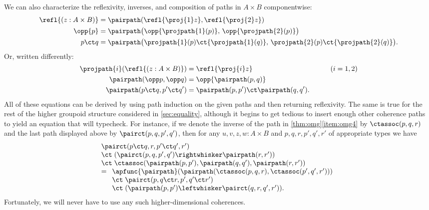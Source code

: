 We can also characterize the reflexivity, inverses, and composition of paths in $A\times B$ componentwise:
\begin{align*}
  {\refl{(z : A \times B)}}
  &= {\pairpath (\refl{\proj{1} z},\refl{\proj{2} z})} \\
  {\opp{p}}
  &= {\pairpath \big(\opp{\projpath{1} (p)},\, \opp{\projpath{2} (p)}\big)} \\
  {{p \ct q}}
  &= {\pairpath \big({\projpath{1} (p)} \ct {\projpath{1} (q)},\,{\projpath{2} (p)} \ct {\projpath{2} (q)}\big)}.
\end{align*}
Or, written differently:
\begin{alignat*}{2}
  \projpath{i}(\refl{(z : A \times B)}) &= \refl{\proj{i} z} &\qquad (i=1,2)\\
  \pairpath(\opp p, \opp q) &= \opp{\pairpath(p,q)}\\
  \pairpath(p\ct q, p'\ct q') &= \pairpath(p,p') \ct \pairpath(q,q').
\end{alignat*}
All of these equations can be derived by using path induction on the given paths and then returning reflexivity.
The same is true for the rest of the higher groupoid structure considered in \cref{sec:equality}, although it begins to get tedious to insert enough other coherence paths to yield an equation that will typecheck.
For instance, if we denote the inverse of the path in \cref{thm:omg}\ref{item:omg4} by $\ctassoc(p,q,r)$ and the last path displayed above by $\pairct(p,q,p',q')$, then for any $u,v,z,w:A\times B$ and $p,q,r,p',q',r'$ of appropriate types we have
\begin{equation*}
  \begin{array}{l}
    \pairct(p\ct q, r, p'\ct q', r') \\
    \ct\;  (\pairct(p,q,p',q') \rightwhisker \pairpath(r,r')) \\
    \ct\;  \ctassoc(\pairpath(p,p'),\pairpath(q,q'),\pairpath(r,r'))\\
    =
    \begin{array}[t]{l}
      \apfunc{\pairpath}({\pairpath(\ctassoc(p,q,r),\ctassoc(p',q',r'))})\\
      \ct\; \pairct(p, q\ct r, p', q'\ct r')\\
      \ct\; (\pairpath(p,p') \leftwhisker \pairct(q,r,q',r')).
    \end{array}
  \end{array}
\end{equation*}
Fortunately, we will never have to use any such higher-dimensional coherences.

